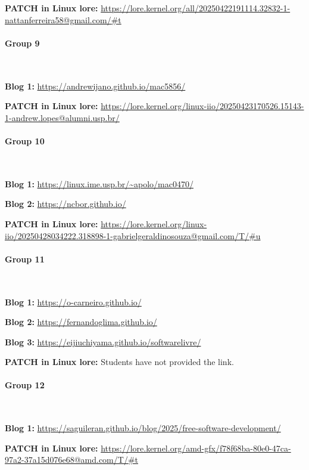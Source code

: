 \textbf{PATCH in Linux lore:} \url{https://lore.kernel.org/all/20250422191114.32832-1-nattanferreira58@gmail.com/#t}

\paragraph{Group 9}

\

\textbf{Blog 1:} \url{https://andrewijano.github.io/mac5856/}

\textbf{PATCH in Linux lore:} \url{https://lore.kernel.org/linux-iio/20250423170526.15143-1-andrew.lopes@alumni.usp.br/}

\paragraph{Group 10}

\

\textbf{Blog 1:} \url{https://linux.ime.usp.br/~apolo/mac0470/}

\textbf{Blog 2:} \url{https://ncbor.github.io/}

\textbf{PATCH in Linux lore:} \url{https://lore.kernel.org/linux-iio/20250428034222.318898-1-gabrielgeraldinosouza@gmail.com/T/#u}

\paragraph{Group 11}

\

\textbf{Blog 1:} \url{https://o-carneiro.github.io/}

\textbf{Blog 2:} \url{https://fernandoglima.github.io/}

\textbf{Blog 3:} \url{https://eijiuchiyama.github.io/softwarelivre/}

\textbf{PATCH in Linux lore:} Students have not provided the link.

\paragraph{Group 12}

\

\textbf{Blog 1:} \url{https://saguileran.github.io/blog/2025/free-software-development/}

\textbf{PATCH in Linux lore:} \url{https://lore.kernel.org/amd-gfx/f78f68ba-80e0-47ca-97a2-37a15d076e68@amd.com/T/#t}

